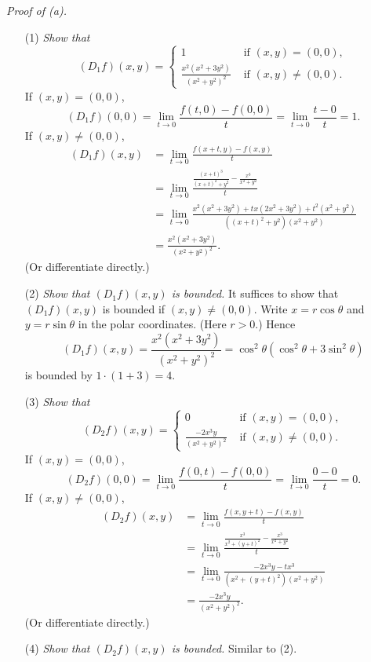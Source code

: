 \documentclass{article}
\begin{document}
\emph{Proof of (a).}
\begin{enumerate}
\item[(1)]
  \emph{Show that}
    \begin{equation*}
    (D_1 f)(x,y) =
      \begin{cases}
        1
          & \text{ if $(x,y)=(0,0)$}, \\
        \frac{x^2(x^2 +3y^2)}{(x^2+y^2)^2}
          & \text{ if $(x,y)\neq(0,0)$}.
      \end{cases}
    \end{equation*}
    If $(x,y) = (0,0)$,
    \[
      (D_1 f)(0,0)
      = \lim_{t \to 0} \frac{f(t,0) - f(0,0)}{t}
      = \lim_{t \to 0} \frac{t - 0}{t}
      = 1.
    \]
    If $(x,y) \neq (0,0)$,
    \begin{align*}
      (D_1 f)(x,y)
      &= \lim_{t \to 0} \frac{f(x+t,y) - f(x,y)}{t} \\
      &= \lim_{t \to 0} \frac{\frac{(x+t)^3}{(x+t)^2+y^2} - \frac{x^3}{x^2+y^2}}{t} \\
      &= \lim_{t \to 0}
        \frac{x^2(x^2+3y^2) + tx(2x^2+3y^2) + t^2(x^2+y^2)}{((x+t)^2+y^2)(x^2+y^2)} \\
      &= \frac{x^2(x^2 +3y^2)}{(x^2+y^2)^2}.
    \end{align*}
    (Or differentiate directly.)

\item[(2)]
  \emph{Show that $(D_1 f)(x,y)$ is bounded.}
  It suffices to show that $(D_1 f)(x,y)$ is bounded if $(x,y) \neq (0,0)$.
  Write $x = r\cos\theta$ and $y = r\sin\theta$ in the polar coordinates.
  (Here $r > 0$.)
  Hence
  \[
    (D_1 f)(x,y)
    = \frac{x^2(x^2 +3y^2)}{(x^2+y^2)^2}
    = \cos^2\theta (\cos^2\theta + 3\sin^2\theta)
  \]
  is bounded by $1\cdot(1+3) = 4$.

\item[(3)]
  \emph{Show that}
    \begin{equation*}
    (D_2 f)(x,y) =
      \begin{cases}
        0
          & \text{ if $(x,y)=(0,0)$}, \\
        \frac{-2x^3y}{(x^2+y^2)^2}
          & \text{ if $(x,y)\neq(0,0)$}.
      \end{cases}
    \end{equation*}
    If $(x,y) = (0,0)$,
    \[
      (D_2 f)(0,0)
      = \lim_{t \to 0} \frac{f(0,t) - f(0,0)}{t}
      = \lim_{t \to 0} \frac{0 - 0}{t}
      = 0.
    \]
    If $(x,y) \neq (0,0)$,
    \begin{align*}
      (D_2 f)(x,y)
      &= \lim_{t \to 0} \frac{f(x,y+t) - f(x,y)}{t} \\
      &= \lim_{t \to 0} \frac{\frac{x^3}{x^2+(y+t)^2} - \frac{x^3}{x^2+y^2}}{t} \\
      &= \lim_{t \to 0}
        \frac{-2x^3y - tx^3}{(x^2+(y+t)^2)(x^2+y^2)} \\
      &= \frac{-2x^3y}{(x^2+y^2)^2}.
    \end{align*}
    (Or differentiate directly.)

\item[(4)]
  \emph{Show that $(D_2 f)(x,y)$ is bounded.}
  Similar to (2).
\end{enumerate}
\end{document}
